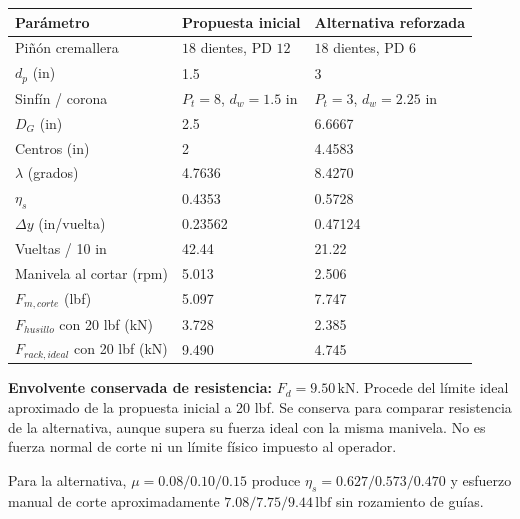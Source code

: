 \documentclass[11pt,a4paper]{article}
\newcommand{\lbf}{\,\mathrm{lbf}}
\begin{document}
\begin{center}\small\begin{tabular}{lll}\toprule

Parámetro & Propuesta inicial & Alternativa reforzada \\ \midrule

Piñón cremallera & $18$ dientes, PD $12$ & $18$ dientes, PD $6$ \\

$d_p$ (in) & 1.5 & 3 \\

Sinfín / corona & $P_t=8$, $d_w=1.5$ in & $P_t=3$, $d_w=2.25$ in \\

$D_G$ (in) & 2.5 & 6.6667 \\

Centros (in) & 2 & 4.4583 \\

$\lambda$ (grados) & 4.7636 & 8.4270 \\

$\eta_s$ & 0.4353 & 0.5728 \\

$\Delta y$ (in/vuelta) & 0.23562 & 0.47124 \\

Vueltas / 10 in & 42.44 & 21.22 \\

Manivela al cortar (rpm) & 5.013 & 2.506 \\

$F_{m,corte}$ (lbf) & 5.097 & 7.747 \\

$F_{husillo}$ con 20 lbf (kN) & 3.728 & 2.385 \\

$F_{rack,ideal}$ con 20 lbf (kN) & 9.490 & 4.745 \\

\bottomrule\end{tabular}\end{center}

\textbf{Envolvente conservada de resistencia:} $F_d=9.50\,\mathrm{kN}$. Procede del límite ideal aproximado de la propuesta inicial a 20 lbf. Se conserva para comparar resistencia de la alternativa, aunque supera su fuerza ideal con la misma manivela. No es fuerza normal de corte ni un límite físico impuesto al operador.

Para la alternativa, $\mu=0.08/0.10/0.15$ produce $\eta_s=0.627/0.573/0.470$ y esfuerzo manual de corte aproximadamente $7.08/7.75/9.44\lbf$ sin rozamiento de guías.
\end{document}
